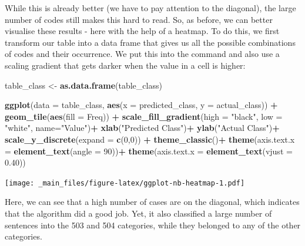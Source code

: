 \documentclass[
]{book}
\newenvironment{Shaded}{\begin{snugshade}}{\end{snugshade}}
\newcommand{\AttributeTok}[1]{\textcolor[rgb]{0.13,0.29,0.53}{#1}}
\newcommand{\DecValTok}[1]{\textcolor[rgb]{0.00,0.00,0.81}{#1}}
\newcommand{\FloatTok}[1]{\textcolor[rgb]{0.00,0.00,0.81}{#1}}
\newcommand{\FunctionTok}[1]{\textcolor[rgb]{0.13,0.29,0.53}{\textbf{#1}}}
\newcommand{\NormalTok}[1]{#1}
\newcommand{\OtherTok}[1]{\textcolor[rgb]{0.56,0.35,0.01}{#1}}
\newcommand{\SpecialCharTok}[1]{\textcolor[rgb]{0.81,0.36,0.00}{\textbf{#1}}}
\newcommand{\StringTok}[1]{\textcolor[rgb]{0.31,0.60,0.02}{#1}}
\begin{document}
While this is already better (we have to pay attention to the diagonal), the large number of codes still makes this hard to read. So, as before, we can better visualise these results - here with the help of a heatmap. To do this, we first transform our table into a data frame that gives us all the possible combinations of codes and their occurrence. We put this into the command and also use a scaling gradient that gets darker when the value in a cell is higher:

\begin{Shaded}
\begin{Highlighting}[]
\NormalTok{table\_class }\OtherTok{\textless{}{-}} \FunctionTok{as.data.frame}\NormalTok{(table\_class)}

\FunctionTok{ggplot}\NormalTok{(}\AttributeTok{data =}\NormalTok{ table\_class, }\FunctionTok{aes}\NormalTok{(}\AttributeTok{x =}\NormalTok{ predicted\_class, }\AttributeTok{y =}\NormalTok{ actual\_class)) }\SpecialCharTok{+}
 \FunctionTok{geom\_tile}\NormalTok{(}\FunctionTok{aes}\NormalTok{(}\AttributeTok{fill =}\NormalTok{ Freq)) }\SpecialCharTok{+}
 \FunctionTok{scale\_fill\_gradient}\NormalTok{(}\AttributeTok{high =} \StringTok{"black"}\NormalTok{, }\AttributeTok{low =} \StringTok{"white"}\NormalTok{, }\AttributeTok{name=}\StringTok{"Value"}\NormalTok{)}\SpecialCharTok{+}
 \FunctionTok{xlab}\NormalTok{(}\StringTok{"Predicted Class"}\NormalTok{)}\SpecialCharTok{+}
 \FunctionTok{ylab}\NormalTok{(}\StringTok{"Actual Class"}\NormalTok{)}\SpecialCharTok{+}
 \FunctionTok{scale\_y\_discrete}\NormalTok{(}\AttributeTok{expand =} \FunctionTok{c}\NormalTok{(}\DecValTok{0}\NormalTok{,}\DecValTok{0}\NormalTok{)) }\SpecialCharTok{+}
 \FunctionTok{theme\_classic}\NormalTok{()}\SpecialCharTok{+}
 \FunctionTok{theme}\NormalTok{(}\AttributeTok{axis.text.x =} \FunctionTok{element\_text}\NormalTok{(}\AttributeTok{angle =} \DecValTok{90}\NormalTok{))}\SpecialCharTok{+}
 \FunctionTok{theme}\NormalTok{(}\AttributeTok{axis.text.x =} \FunctionTok{element\_text}\NormalTok{(}\AttributeTok{vjust =} \FloatTok{0.40}\NormalTok{))}
\end{Highlighting}
\end{Shaded}

\texttt{[image: \_main\_files/figure-latex/ggplot-nb-heatmap-1.pdf]}

Here, we can see that a high number of cases are on the diagonal, which indicates that the algorithm did a good job. Yet, it also classified a large number of sentences into the 503 and 504 categories, while they belonged to any of the other categories.
\end{document}
